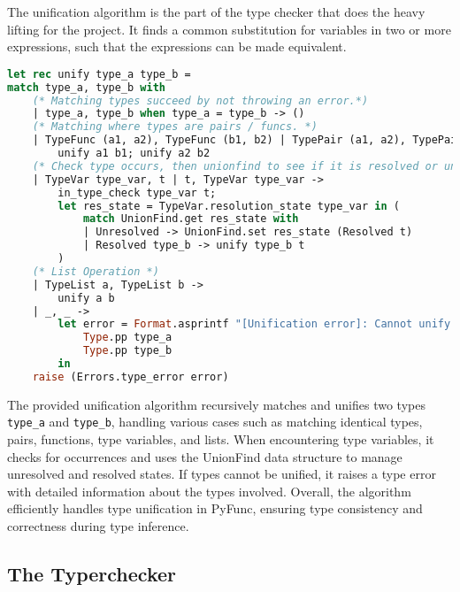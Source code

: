 \documentclass{l4proj}
\begin{document}
The unification algorithm is the part of the type checker that does the heavy lifting for the project.
It finds a common substitution for variables in two or more expressions, such that the expressions can be made equivalent. 
\begin{lstlisting}[language=Caml, caption=PyFunc's unification algorithm.]
let rec unify type_a type_b = 
match type_a, type_b with
    (* Matching types succeed by not throwing an error.*)
    | type_a, type_b when type_a = type_b -> () 
    (* Matching where types are pairs / funcs. *)
    | TypeFunc (a1, a2), TypeFunc (b1, b2) | TypePair (a1, a2), TypePair (b1, b2) -> 
        unify a1 b1; unify a2 b2
    (* Check type occurs, then unionfind to see if it is resolved or unresolved. *)
    | TypeVar type_var, t | t, TypeVar type_var -> 
        in_type_check type_var t;
        let res_state = TypeVar.resolution_state type_var in (
            match UnionFind.get res_state with
            | Unresolved -> UnionFind.set res_state (Resolved t)
            | Resolved type_b -> unify type_b t
        )
    (* List Operation *)
    | TypeList a, TypeList b -> 
        unify a b
    | _, _ -> 
        let error = Format.asprintf "[Unification error]: Cannot unify %a with %a" 
            Type.pp type_a 
            Type.pp type_b 
        in 
    raise (Errors.type_error error)
\end{lstlisting}

The provided unification algorithm recursively matches and unifies two types \texttt{type\_a} and \texttt{type\_b}, handling various cases such as matching identical types, pairs, functions, type variables, and lists.
When encountering type variables, it checks for occurrences and uses the UnionFind data structure to manage unresolved and resolved states.
If types cannot be unified, it raises a type error with detailed information about the types involved.
Overall, the algorithm efficiently handles type unification in PyFunc, ensuring type consistency and correctness during type inference.

\subsection{The Typerchecker}
\end{document}
